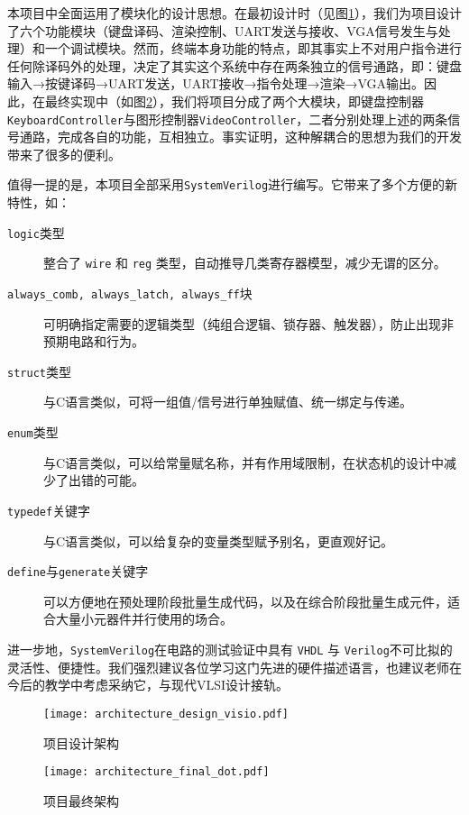 
本项目中全面运用了模块化的设计思想。在最初设计时（见图\ref{fig:design_architecture}），我们为项目设计了六个功能模块（键盘译码、渲染控制、UART发送与接收、VGA信号发生与处理）和一个调试模块。然而，终端本身功能的特点，即其事实上不对用户指令进行任何除译码外的处理，决定了其实这个系统中存在两条独立的信号通路，即：键盘输入→按键译码→UART发送，UART接收→指令处理→渲染→VGA输出。因此，在最终实现中（如图\ref{fig:final_architecture}），我们将项目分成了两个大模块，即键盘控制器\texttt{KeyboardController}与图形控制器\texttt{VideoController}，二者分别处理上述的两条信号通路，完成各自的功能，互相独立。事实证明，这种解耦合的思想为我们的开发带来了很多的便利。

值得一提的是，本项目全部采用\texttt{SystemVerilog}进行编写。它带来了多个方便的新特性，如：
\begin{description}
  \item[\texttt{logic}类型] 整合了 \texttt{wire} 和 \texttt{reg} 类型，自动推导几类寄存器模型，减少无谓的区分。
  \item[\texttt{always\_comb, always\_latch, always\_ff}块] 可明确指定需要的逻辑类型（纯组合逻辑、锁存器、触发器），防止出现非预期电路和行为。
  \item[\texttt{struct}类型] 与C语言类似，可将一组值/信号进行单独赋值、统一绑定与传递。
  \item[\texttt{enum}类型] 与C语言类似，可以给常量赋名称，并有作用域限制，在状态机的设计中减少了出错的可能。
  \item[\texttt{typedef}关键字] 与C语言类似，可以给复杂的变量类型赋予别名，更直观好记。
  \item[\texttt{define}与\texttt{generate}关键字] 可以方便地在预处理阶段批量生成代码，以及在综合阶段批量生成元件，适合大量小元器件并行使用的场合。
\end{description}

进一步地，\texttt{SystemVerilog}在电路的测试验证中具有 \texttt{VHDL} 与 \texttt{Verilog}不可比拟的灵活性、便捷性。我们强烈建议各位学习这门先进的硬件描述语言，也建议老师在今后的教学中考虑采纳它，与现代VLSI设计接轨。

\begin{figure}[htbp]
\centerline{
\texttt{[image: architecture\_design\_visio.pdf]}
}
\label{fig:design_architecture}
\caption{项目设计架构}
\end{figure}

\begin{figure}[htbp]
\centerline{
\texttt{[image: architecture\_final\_dot.pdf]}
}
\label{fig:final_architecture}
\caption{项目最终架构}
\end{figure}